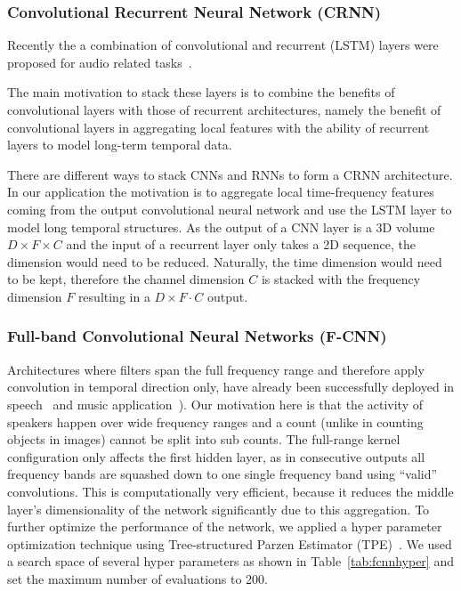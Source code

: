 \subsubsection{Convolutional Recurrent Neural Network (CRNN)}%
Recently the a combination of convolutional and recurrent (LSTM) layers were proposed for audio related tasks~\cite{sainath15, amodei16, Choi17, cakir17}.

The main motivation to stack these layers is to combine the benefits of convolutional layers with those of recurrent architectures, namely the benefit of convolutional layers in aggregating local features with the ability of recurrent layers to model long-term temporal data.

There are different ways to stack CNNs and RNNs to form a CRNN architecture.
In our application the motivation is to aggregate local time-frequency features coming from the output convolutional neural network and use the LSTM layer to model long temporal structures.
As the output of a CNN layer is a 3D volume \(D \times F \times C\) and the input of a recurrent layer only takes a 2D sequence, the dimension would need to be reduced. Naturally, the time dimension would need to be kept, therefore the channel dimension \(C\) is stacked with the frequency dimension \(F\) resulting in a \(D \times F \cdot C\) output.

\subsubsection{Full-band Convolutional Neural Networks (F-CNN)}%
Architectures where filters span the full frequency range and therefore apply convolution in temporal direction only, have already been successfully deployed in speech~\cite{amodei16} and music application~\cite{Choi17, Pons16, Dieleman14}).
Our motivation here is that the activity of speakers happen over wide frequency ranges and a count (unlike in counting objects in images) cannot be split into sub counts.
The full-range kernel configuration only affects the first hidden layer, as in consecutive outputs all frequency bands are squashed down to one single frequency band using ``valid'' convolutions.
This is computationally very efficient, because it reduces the middle layer's dimensionality of the network significantly due to this aggregation.
To further optimize the performance of the network, we applied a hyper parameter optimization technique using Tree-structured Parzen Estimator (TPE)~\cite{bergstra11}.
We used a search space of several hyper parameters as shown in Table~\ref{tab:fcnnhyper} and set the maximum number of evaluations to 200.

